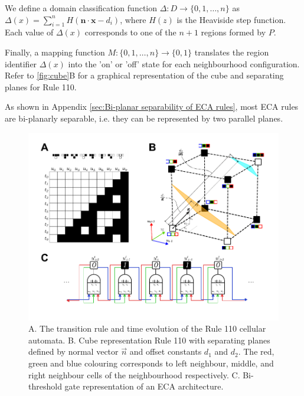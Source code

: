 We define a domain classification function \( \Delta: D \to \{0, 1, \ldots, n\} \) as \( \Delta(x) = \sum_{i=1}^{n} H(\mathbf{n} \cdot \mathbf{x} - d_i) \), where \( H(z) \) is the Heaviside step function. Each value of \( \Delta(x) \) corresponds to one of the \( n+1 \) regions formed by \( P \).

Finally, a mapping function \( M: \{0, 1, \ldots, n\} \to \{0, 1\} \) translates the region identifier \( \Delta(x) \) into the 'on' or 'off' state for each neighbourhood configuration.
Refer to \autoref*{fig:cube}B for a graphical representation of the cube and separating planes for Rule 110.

As shown in Appendix \ref*{sec:Bi-planar separability of ECA rules}, most ECA rules are bi-planarly separable, i.e. they can be represented by two parallel planes. 


\begin{figure}[ht]
    
    \centering
    \includegraphics[width=\textwidth]{images/SVGs/Cube.pdf}
    \caption{A. The transition rule and time evolution of the Rule 110 cellular automata. B. Cube representation Rule 110 with separating planes defined by normal vector $\overrightarrow{n}$ and offset constants $d_1$ and $d_2$. The red, green and blue colouring corresponds to left neighbour, middle, and right neighbour cells of the neighbourhood respectively. C. Bi-threshold gate representation of an ECA architecture.}
    \label{fig:cube}
\end{figure}



